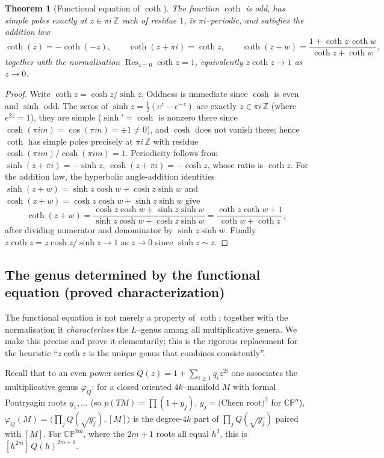 \documentclass[12pt]{article}
\newtheorem{theorem}{Theorem}
\theoremstyle{definition}
\begin{document}
\begin{theorem}[Functional equation of $\coth$]\label{thm:funeq}
The function $\coth$ is odd, has simple poles exactly at $z\in\pi i\,\mathbb Z$ each of
residue $1$, is $\pi i$--periodic, and satisfies the addition law
\[
\coth(z)=-\coth(-z),\qquad
\coth(z+\pi i)=\coth z,\qquad
\coth(z+w)=\frac{1+\coth z\,\coth w}{\coth z+\coth w},
\tag{11}\label{eq:funeq}
\]
together with the normalisation $\operatorname{Res}_{z=0}\coth z=1$, equivalently
$z\coth z\to 1$ as $z\to 0$.
\end{theorem}

\begin{proof}
Write $\coth z=\cosh z/\sinh z$. Oddness is immediate since $\cosh$ is even and $\sinh$
odd. The zeros of $\sinh z=\tfrac12(e^z-e^{-z})$ are exactly $z\in\pi i\,\mathbb Z$
(where $e^{2z}=1$), they are simple ($\sinh'=\cosh$ is nonzero there since
$\cosh(\pi i m)=\cos(\pi m)=\pm1\ne0$), and $\cosh$ does not vanish there; hence $\coth$
has simple poles precisely at $\pi i\,\mathbb Z$ with residue
$\cosh(\pi i m)/\cosh(\pi i m)=1$. Periodicity follows from
$\sinh(z+\pi i)=-\sinh z$, $\cosh(z+\pi i)=-\cosh z$, whose ratio is $\coth z$. For the
addition law, the hyperbolic angle-addition identities
$\sinh(z+w)=\sinh z\cosh w+\cosh z\sinh w$ and
$\cosh(z+w)=\cosh z\cosh w+\sinh z\sinh w$ give
\[
\coth(z+w)
=\frac{\cosh z\cosh w+\sinh z\sinh w}{\sinh z\cosh w+\cosh z\sinh w}
=\frac{\coth z\coth w+1}{\coth w+\coth z},
\]
after dividing numerator and denominator by $\sinh z\sinh w$. Finally
$z\coth z=z\cosh z/\sinh z\to 1$ as $z\to0$ since $\sinh z\sim z$.
\end{proof}

\subsection*{The genus determined by the functional equation (proved characterization)}

The functional equation is not merely a property of $\coth$; together with the
normalisation it \emph{characterizes} the $L$--genus among all multiplicative genera. We
make this precise and prove it elementarily; this is the rigorous replacement for the
heuristic ``$z\coth z$ is the unique genus that combines consistently''.

Recall that to an even power series $Q(z)=1+\sum_{i\ge1}q_iz^{2i}$ one associates the
multiplicative genus $\varphi_Q$: for a closed oriented $4k$--manifold $M$ with formal
Pontryagin roots $y_1,\dots$ (so $p(TM)=\prod(1+y_j)$, $y_j=\text{(Chern root)}^2$ for
$\mathbb{CP}^n$), $\varphi_Q(M)=\big\langle\prod_jQ(\sqrt{y_j}),[M]\big\rangle$ is the
degree-$4k$ part of $\prod_jQ(\sqrt{y_j})$ paired with $[M]$. For $\mathbb{CP}^{2m}$,
where the $2m{+}1$ roots all equal $h^2$, this is $[h^{2m}]\,Q(h)^{2m+1}$.
\end{document}
